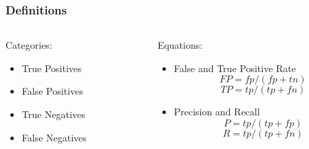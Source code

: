 \documentclass{beamer}
\begin{document}
\begin{frame}
\frametitle[Definitions]{Definitions}
\begin{columns}
\begin{column}{0.5\textwidth}
Categories:
\begin{itemize}
\item True Positives
\item False Positives
\item True Negatives
\item False Negatives
\end{itemize}
\end{column}
\begin{column}{0.5\textwidth}
Equations:
\begin{itemize}
\item False and True Positive Rate
\begin{equation*}
FP = fp / (fp + tn)
\end{equation*}
\begin{equation*}
TP = tp / (tp + fn)
\end{equation*}
\item Precision and Recall
\begin{equation*}
P = tp / (tp + fp)
\end{equation*}
\begin{equation*}
R = tp / (tp + fn)
\end{equation*}
\end{itemize}
\end{column}
\end{columns}
\end{frame}
\end{document}
